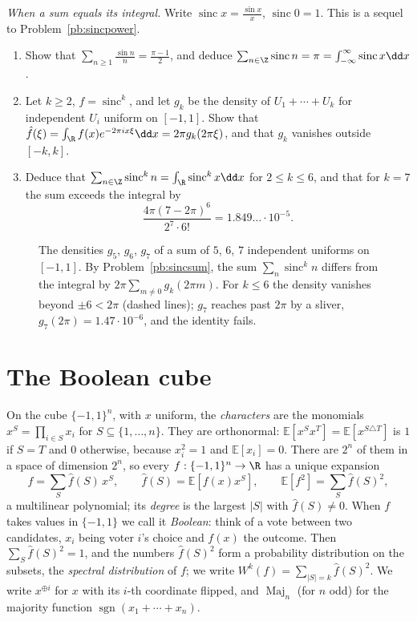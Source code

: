 \begin{exercise}[$\star\star\star$]\label{pb:sincsum}
\emph{When a sum equals its integral.} Write $\operatorname{sinc}x=\frac{\sin x}x$, $\operatorname{sinc}0=1$. This is a sequel to
Problem~\ref{pb:sincpower}.
\begin{enumerate}[label=(\alph*)]
\item Show that $\sum_{n\ge1}\frac{\sin n}n=\frac{\pi-1}2$, and deduce $\sum_{n\in\Z}\operatorname{sinc}n=\pi=\int_{-\infty}^\infty\operatorname{sinc}x\dd x$.
\item Let $k\ge2$, $f=\operatorname{sinc}^k$, and let $g_k$ be the density of $U_1+\cdots+U_k$ for independent $U_i$ uniform on $[-1,1]$. Show
that $\hat f(\xi)=\int_{\R}f(x)e^{-2\pi ix\xi}\dd x=2\pi g_k(2\pi\xi)$, and that $g_k$ vanishes outside $[-k,k]$.
\item Deduce that $\sum_{n\in\Z}\operatorname{sinc}^kn=\int_{\R}\operatorname{sinc}^kx\dd x$ for $2\le k\le6$, and that for $k=7$ the sum exceeds the
integral by
\[
\frac{4\pi(7-2\pi)^6}{2^7\cdot6!}=1.849\ldots\cdot10^{-5}.
\]
\end{enumerate}
\end{exercise}

\begin{figure}[ht]
\centering
{}
\caption{The densities $g_5$, $g_6$, $g_7$ of a sum of $5$, $6$, $7$ independent uniforms on $[-1,1]$. By Problem~\ref{pb:sincsum}, the sum
$\sum_n\operatorname{sinc}^kn$ differs from the integral by $2\pi\sum_{m\ne0}g_k(2\pi m)$. For $k\le6$ the density vanishes beyond $\pm6<2\pi$
(dashed lines); $g_7$ reaches past $2\pi$ by a sliver, $g_7(2\pi)=1.47\cdot10^{-6}$, and the identity fails.}
\label{fig:sinc}
\end{figure}

\section{The Boolean cube}

On the cube $\{-1,1\}^n$, with $x$ uniform, the \emph{characters} are the monomials $x^S=\prod_{i\in S}x_i$ for $S\subseteq\{1,\dots,n\}$. They are
orthonormal: $\mathbb E[x^Sx^T]=\mathbb E[x^{S\triangle T}]$ is $1$ if $S=T$ and $0$ otherwise, because $x_i^2=1$ and $\mathbb E[x_i]=0$. There are $2^n$ of them
in a space of dimension $2^n$, so every $f:\{-1,1\}^n\to\R$ has a unique expansion
\[
f=\sum_S\hat f(S)\,x^S,\qquad\hat f(S)=\mathbb E[f(x)x^S],\qquad\mathbb E[f^2]=\sum_S\hat f(S)^2,
\]
a multilinear polynomial; its \emph{degree} is the largest $|S|$ with $\hat f(S)\ne0$. When $f$ takes values in $\{-1,1\}$ we call it
\emph{Boolean}: think of a vote between two candidates, $x_i$ being voter $i$'s choice and $f(x)$ the outcome. Then
$\sum_S\hat f(S)^2=1$, and the numbers $\hat f(S)^2$ form a probability distribution on the subsets, the \emph{spectral distribution}
of $f$; we write $W^k(f)=\sum_{|S|=k}\hat f(S)^2$. We write $x^{\oplus i}$ for $x$ with its $i$-th coordinate flipped, and $\operatorname{Maj}_n$ (for $n$
odd) for the majority function $\operatorname{sgn}(x_1+\cdots+x_n)$.

